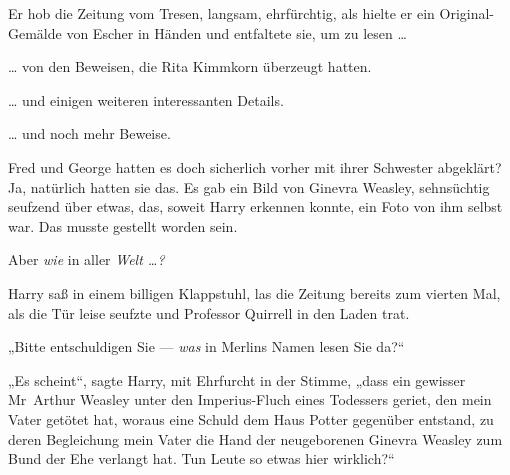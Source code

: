 Er hob die Zeitung vom Tresen, langsam, ehrfürchtig, als hielte er ein Original-Gemälde von Escher in Händen und entfaltete sie, um zu lesen …

… von den Beweisen, die Rita Kimmkorn überzeugt hatten.

… und einigen weiteren interessanten Details.

… und noch mehr Beweise.

Fred und George hatten es doch sicherlich vorher mit ihrer Schwester abgeklärt? Ja, natürlich hatten sie das. Es gab ein Bild von Ginevra Weasley, sehnsüchtig seufzend über etwas, das, soweit Harry erkennen konnte, ein Foto von ihm selbst war. Das musste gestellt worden sein.

Aber \emph{wie} in aller \emph{Welt …?}

Harry saß in einem billigen Klappstuhl, las die Zeitung bereits zum vierten Mal, als die Tür leise seufzte und Professor Quirrell in den Laden trat.

„Bitte entschuldigen Sie — \emph{was} in Merlins Namen lesen Sie da?“

„Es scheint“, sagte Harry, mit Ehrfurcht in der Stimme, „dass ein gewisser Mr~Arthur Weasley unter den Imperius-Fluch eines Todessers geriet, den mein Vater getötet hat, woraus eine Schuld dem Haus Potter gegenüber entstand, zu deren Begleichung mein Vater die Hand der neugeborenen Ginevra Weasley zum Bund der Ehe verlangt hat. Tun Leute so etwas hier wirklich?“

